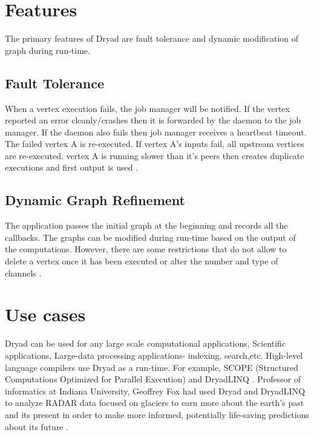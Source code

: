 \documentclass[9pt,twocolumn,twoside]{../../styles/osajnl}
\begin{document}
\section{Features}
The primary features of Dryad are fault tolerance and dynamic
modification of graph during run-time. \subsection{Fault Tolerance}
When a vertex execution fails, the job manager will be notified. If
the vertex reported an error cleanly/crashes then it is forwarded by
the daemon to the job manager. If the daemon also fails then job
manager receives a heartbeat timeout. The failed vertex A is
re-executed. If vertex A's inputs fail, all upstream vertices are
re-executed. vertex A is running slower than it's peers then creates
duplicate executions and first output is used \cite{www-DryadYT}.
\subsection{Dynamic Graph Refinement}
The application passes the initial graph at the beginning and records
all the callbacks. The graphs can be modified during run-time based on
the output of the computations. However, there are some restrictions
that do not allow to delete a vertex once it has been executed or
alter the number and type of channels \cite{www-DryadYT}. 
\section{Use cases}
Dryad can be used for any large scale computational applications,
Scientific applications, Large-data processing applications- indexing,
search,etc. High-level language compilers use Dryad as a run-time. For
example, SCOPE (Structured Computations Optimized for Parallel
Execution) and DryadLINQ \cite{www-DryadWiki}. Professor of
informatics at Indiana University, Geoffrey Fox had used Dryad and
DryadLINQ to analyze RADAR data focused on glaciers to earn more about
the earth’s past and its present in order to make more informed,
potentially life-saving predictions about its future
\cite{www-DryadUse}.
\end{document}
